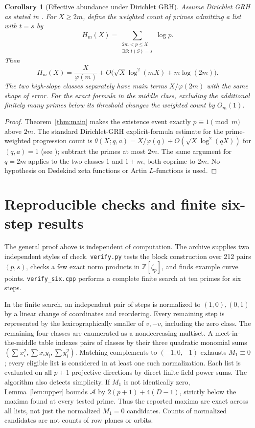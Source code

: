 \documentclass[11pt]{article}
\newtheorem{corollary}[theorem]{Corollary}
\theoremstyle{remark}\newtheorem{remark}[theorem]{Remark}
\newcommand{\Z}{\mathbb Z}
\newcommand{\A}{\mathcal A}
\begin{document}
\begin{corollary}[Effective abundance under Dirichlet GRH]
Assume Dirichlet GRH as stated in \cite{upstream}. For $X\ge2m$, define the weighted count of primes admitting a list with $t=s$ by
\[
 H_m(X)=\sum_{\substack{2m<p\le X\\\exists S:\,t(S)=s}}\log p.
\]
Then
\[
 H_m(X)=\frac{X}{\varphi(m)}+O\big(\sqrt X\log^2(mX)+m\log(2m)\big).
\]
The two high-slope classes separately have main terms $X/\varphi(2m)$ with the same shape of error. For the exact formula in the middle class, excluding the additional finitely many primes below its threshold changes the weighted count by $O_m(1)$.
\end{corollary}
\begin{proof}
Theorem~\ref{thm:main} makes the existence event exactly $p\equiv1\pmod m$ above $2m$. The standard Dirichlet-GRH explicit-formula estimate for the prime-weighted progression count is $\theta(X;q,a)=X/\varphi(q)+O(\sqrt X\log^2(qX))$ for $(q,a)=1$ (see \cite{lee}); subtract the primes at most $2m$. The same argument for $q=2m$ applies to the two classes $1$ and $1+m$, both coprime to $2m$. No hypothesis on Dedekind zeta functions or Artin $L$-functions is used.
\end{proof}

\section{Reproducible checks and finite six-step results}
The general proof above is independent of computation. The archive supplies two independent styles of check. \texttt{verify.py} tests the block construction over 212 pairs $(p,s)$, checks a few exact norm products in $\Z[\zeta_p]$, and finds example curve points. \texttt{verify\_six.cpp} performs a complete finite search at ten primes for six steps.

In the finite search, an independent pair of steps is normalized to $(1,0),(0,1)$ by a linear change of coordinates and reordering. Every remaining step is represented by the lexicographically smaller of $v,-v$, including the zero class. The remaining four classes are enumerated as a nondecreasing multiset. A meet-in-the-middle table indexes pairs of classes by their three quadratic monomial sums $(\sum x_i^2,\sum x_i y_i,\sum y_i^2)$. Matching complements to $(-1,0,-1)$ exhausts $M_1\equiv0$; every eligible list is considered in at least one such normalization. Each list is evaluated on all $p+1$ projective directions by direct finite-field power sums. The algorithm also detects simplicity. If $M_1$ is not identically zero, Lemma~\ref{lem:upper} bounds $\A$ by $2(p+1)+4(D-1)$, strictly below the maxima found at every tested prime. Thus the reported maxima are exact across all lists, not just the normalized $M_1=0$ candidates. Counts of normalized candidates are not counts of row planes or orbits.
\end{document}
